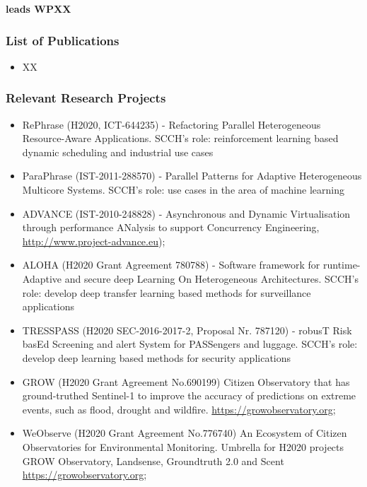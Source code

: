 \documentclass[a4paper,11pt]{article}
\begin{document}
\vspace{10pt}
\textbf{\SCCHshort{} leads WPXX}
\vspace{10pt}

\subsubsection*{List of Publications}

\begin{itemize}

\item XX
  
\end{itemize}

\subsubsection*{Relevant Research Projects}

\begin{itemize}

\item RePhrase (H2020, ICT-644235) - Refactoring Parallel Heterogeneous Resource-Aware Applications. SCCH's role: reinforcement learning based dynamic scheduling and industrial use cases

\item ParaPhrase (IST-2011-288570) - Parallel Patterns for Adaptive Heterogeneous Multicore Systems. SCCH's role: use cases in the area of machine learning

\item ADVANCE (IST-2010-248828) - Asynchronous and Dynamic Virtualisation through performance ANalysis to support Concurrency Engineering, \url{http://www.project-advance.eu});

\item ALOHA (H2020 Grant Agreement 780788) - Software framework for runtime-Adaptive and secure deep Learning On Heterogeneous Architectures. SCCH's role: develop deep transfer learning based methods for surveillance applications

\item TRESSPASS (H2020 SEC-2016-2017-2, Proposal Nr. 787120) - robusT Risk basEd Screening and alert System for PASSengers and luggage. SCCH's role: develop deep learning based methods for security applications

\item GROW (H2020 Grant Agreement No.690199) Citizen Observatory that has ground-truthed Sentinel-1 to improve the accuracy of predictions on extreme events, such as flood, drought and wildfire. \url{https://growobservatory.org};

\item WeObserve (H2020 Grant Agreement No.776740) An Ecosystem of Citizen Observatories for Environmental Monitoring. Umbrella for H2020 projects GROW Observatory, Landsense, Groundtruth 2.0 and Scent \url{https://growobservatory.org};

\end{itemize}
\end{document}
